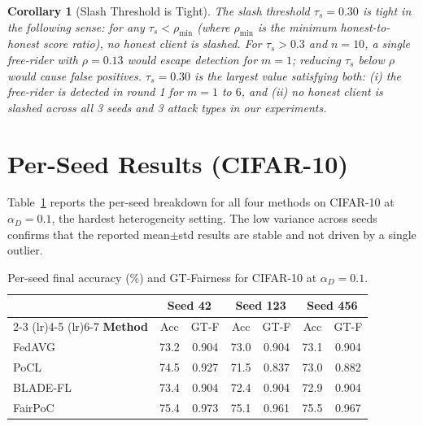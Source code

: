 \documentclass[journal]{IEEEtran}
\newtheorem{corollary}[theorem]{Corollary}
\theoremstyle{definition}
\theoremstyle{remark}
\begin{document}
\begin{corollary}[Slash Threshold is Tight]
\label{cor:threshold_tight}
The slash threshold $\tau_s = 0.30$ is tight in the following sense:
for any $\tau_s < \rho_{\min}$ (where $\rho_{\min}$ is the minimum
honest-to-honest score ratio), no honest client is slashed.
For $\tau_s > 0.3$ and $n = 10$, a single free-rider with $\rho = 0.13$
would escape detection for $m = 1$; reducing $\tau_s$ below $\rho$
would cause false positives.
$\tau_s = 0.30$ is the largest value satisfying both:
(i) the free-rider is detected in round 1 for $m = 1$ to $6$, and
(ii) no honest client is slashed across all 3 seeds and 3 attack types
in our experiments.
\end{corollary}

\section{Per-Seed Results (CIFAR-10)}
\label{appendix:additional}

Table~\ref{tab:per_seed} reports the per-seed breakdown for all
four methods on CIFAR-10 at $\alpha_D = 0.1$, the hardest
heterogeneity setting.
The low variance across seeds confirms that the reported
mean$\pm$std results are stable and not driven by a single outlier.

\begin{table}[h]
\caption{Per-seed final accuracy (\%) and GT-Fairness for CIFAR-10
at $\alpha_D{=}0.1$.}
\label{tab:per_seed}
\centering
\renewcommand{\arraystretch}{1.1}
\setlength{\tabcolsep}{4pt}
\footnotesize
\begin{tabular}{lcccccc}
\toprule
 & \multicolumn{2}{c}{\textbf{Seed 42}} &
   \multicolumn{2}{c}{\textbf{Seed 123}} &
   \multicolumn{2}{c}{\textbf{Seed 456}} \\
\cmidrule(lr){2-3} \cmidrule(lr){4-5} \cmidrule(lr){6-7}
\textbf{Method} & Acc & GT-F & Acc & GT-F & Acc & GT-F \\
\midrule
FedAVG   & 73.2 & 0.904 & 73.0 & 0.904 & 73.1 & 0.904 \\
PoCL     & 74.5 & 0.927 & 71.5 & 0.837 & 73.0 & 0.882 \\
BLADE-FL & 73.4 & 0.904 & 72.4 & 0.904 & 72.9 & 0.904 \\
FairPoC  & 75.4 & 0.973 & 75.1 & 0.961 & 75.5 & 0.967 \\
\bottomrule
\end{tabular}
\end{table}
\end{document}
